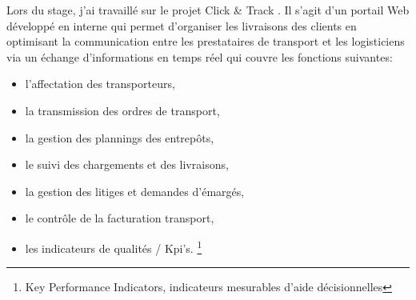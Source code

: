 
	Lors du stage, j'ai travaillé sur le projet Click \& Track . Il s'agit d'un portail Web développé en interne qui permet d'organiser les livraisons des clients en optimisant la communication entre les prestataires de transport et les logisticiens via un échange d'informations en temps réel qui couvre les fonctions suivantes:
	\begin{itemize}
		\item l'affectation des transporteurs,
		\item la transmission des ordres de transport,
		\item la gestion des plannings des entrepôts,
		\item le suivi des chargements et des livraisons,
		\item la gestion des litiges et demandes d'émargés,
		\item le contrôle de la facturation transport,
		\item les indicateurs de qualités / Kpi's. \footnote{Key Performance Indicators, indicateurs mesurables d'aide décisionnelles}
	\end{itemize}
	